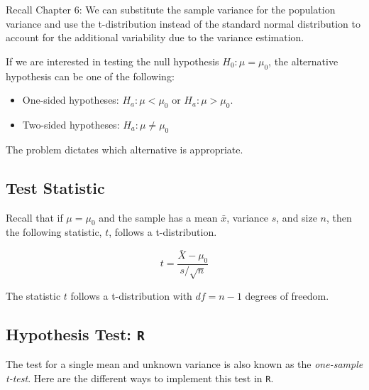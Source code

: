 \documentclass[
  letterpaper,
  DIV=11,
  numbers=noendperiod]{scrartcl}
\providecommand{\tightlist}{%
  \setlength{\itemsep}{0pt}\setlength{\parskip}{0pt}}
\begin{document}
\begin{tcolorbox}[enhanced jigsaw, bottomtitle=1mm, colback=white, opacityback=0, leftrule=.75mm, opacitybacktitle=0.6, coltitle=black, left=2mm, colframe=quarto-callout-note-color-frame, toptitle=1mm, colbacktitle=quarto-callout-note-color!10!white, titlerule=0mm, title=\textcolor{quarto-callout-note-color}{\faInfo}\hspace{0.5em}{Note}, arc=.35mm, rightrule=.15mm, breakable, bottomrule=.15mm, toprule=.15mm]

Recall Chapter 6: We can substitute the sample variance for the
population variance and use the t-distribution instead of the standard
normal distribution to account for the additional variability due to the
variance estimation.

\end{tcolorbox}

If we are interested in testing the null hypothesis \(H_0: \mu=\mu_0\),
the alternative hypothesis can be one of the following:

\begin{itemize}
\tightlist
\item
  One-sided hypotheses: \(H_a: \mu < \mu_0\) or \(H_a: \mu > \mu_0\).
\item
  Two-sided hypotheses: \(H_a: \mu \neq \mu_0\)
\end{itemize}

The problem dictates which alternative is appropriate.

\subsection{Test Statistic}\label{test-statistic-2}

Recall that if \(\mu=\mu_0\) and the sample has a mean \(\bar{x}\),
variance \(s\), and size \(n\), then the following statistic, \(t\),
follows a t-distribution.

\[
t = \frac{\bar{X}-\mu_0}{s/\sqrt{n}}
\]

The statistic \(t\) follows a t-distribution with \(df=n-1\) degrees of
freedom.

\subsection{\texorpdfstring{Hypothesis Test:
\texttt{R}}{Hypothesis Test: R}}\label{hypothesis-test-r}

The test for a single mean and unknown variance is also known as the
\emph{one-sample t-test}. Here are the different ways to implement this
test in \texttt{R}.
\end{document}
